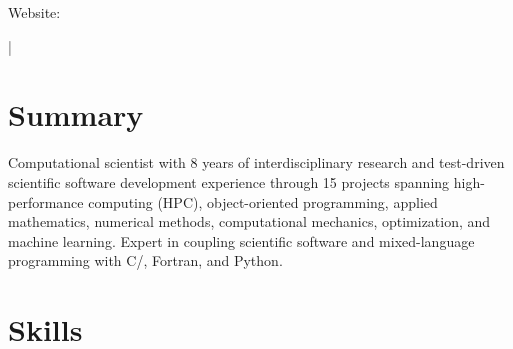 \documentclass[letterpaper,10pt]{article}
\begin{document}
{\scshape\huge\Author}\vspace{2pt}

\begin{small}
  Website: \href{\AuthorWebsiteLink}{\AuthorWebsiteText}

  \vspace{2pt}\AuthorAddress

  \vspace{2pt}\href{mailto:\AuthorEmail}{\AuthorEmail} |
  \href{\AuthorPhoneLink}{\AuthorPhoneText}
\end{small}

\section{Summary}
Computational scientist with 8 years of interdisciplinary research and
test-driven scientific software development experience through 15\smallplus{}
projects spanning high-performance computing (HPC), object-oriented programming,
applied mathematics, numerical methods, computational mechanics, optimization,
and machine learning. Expert in coupling scientific software and mixed-language
programming with C/\CC{}, Fortran, and Python.

\section{Skills}
  \resumeSubItemListStart
  \resumeSubItemListEnd
\end{document}
